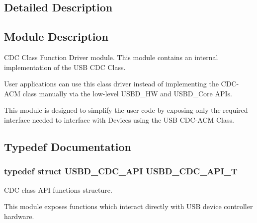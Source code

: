 \subsection{Detailed Description}
\hypertarget{group__USBD__CDC_Sec_CDCModDescription}{}\subsection{Module Description}\label{group__USBD__CDC_Sec_CDCModDescription}
C\+DC Class Function Driver module. This module contains an internal implementation of the U\+SB C\+DC Class.

User applications can use this class driver instead of implementing the C\+D\+C-\/\+A\+CM class manually via the low-\/level U\+S\+B\+D\+\_\+\+HW and U\+S\+B\+D\+\_\+\+Core A\+P\+Is.

This module is designed to simplify the user code by exposing only the required interface needed to interface with Devices using the U\+SB C\+D\+C-\/\+A\+CM Class. 

\subsection{Typedef Documentation}
\subsubsection[{\texorpdfstring{U\+S\+B\+D\+\_\+\+C\+D\+C\+\_\+\+A\+P\+I\+\_\+T}{USBD_CDC_API_T}}]{\setlength{\rightskip}{0pt plus 5cm}typedef struct {\bf U\+S\+B\+D\+\_\+\+C\+D\+C\+\_\+\+A\+PI}  {\bf U\+S\+B\+D\+\_\+\+C\+D\+C\+\_\+\+A\+P\+I\+\_\+T}}\hypertarget{group__USBD__CDC_gaad7f61aed01ad4130bee0f50b17eb716}{}\label{group__USBD__CDC_gaad7f61aed01ad4130bee0f50b17eb716}


C\+DC class A\+PI functions structure.

This module exposes functions which interact directly with U\+SB device controller hardware. 

